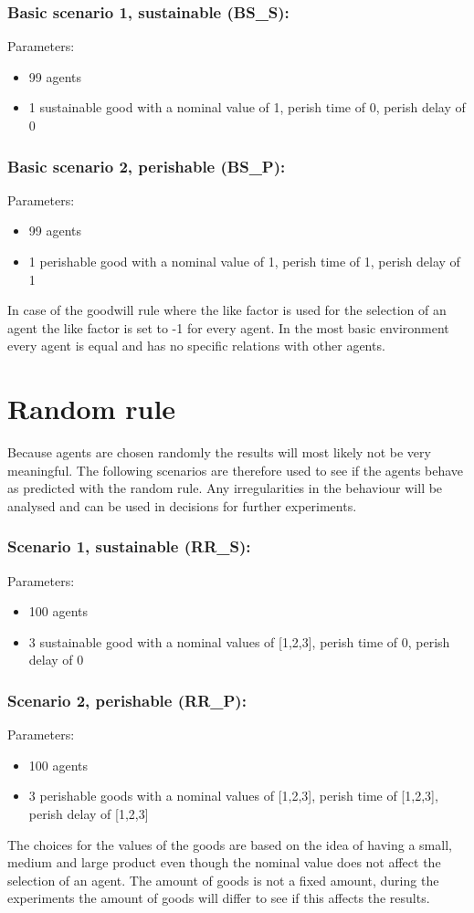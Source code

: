 \documentclass[twoside,openright]{uva-bachelor-thesis}
\begin{document}
\subsubsection{Basic scenario 1, sustainable (BS\_S):}
Parameters:
\begin{itemize}
\item	99 agents
\item	1 sustainable good with a nominal value of 1, perish time of 0, perish delay of 0
\end{itemize}
\subsubsection{Basic scenario 2, perishable (BS\_P):}
Parameters:
\begin{itemize}
\item	99 agents
\item	1 perishable good with a nominal value of 1, perish time of 1, perish delay of 1
\end{itemize}
In case of the goodwill rule where the like factor is used for the selection of an agent the like factor is set to -1 for every agent. In the most basic environment every agent is equal and has no specific relations with other agents.

\section{Random rule}
Because agents are chosen randomly the results will most likely not be very meaningful. The following scenarios are therefore used to see if the agents behave as predicted with the random rule.  Any irregularities in the behaviour will be analysed and can be used in decisions for further experiments.
\subsubsection{Scenario 1, sustainable (RR\_S):}
Parameters:
\begin{itemize}
\item	100 agents
\item	3 sustainable good with a nominal values of [1,2,3], perish time of 0, perish delay of 0
\end{itemize}
\subsubsection{Scenario 2, perishable (RR\_P):}
Parameters:
\begin{itemize}
\item	100 agents
\item	3 perishable goods with a nominal values of [1,2,3], perish time of [1,2,3], perish delay of [1,2,3]
\end{itemize}
The choices for the values of the goods are based on the idea of having a small, medium and large product even though the nominal value does not affect the selection of an agent. The amount of goods is not a fixed amount, during the experiments the amount of goods will differ to see if this affects the results.
\end{document}
